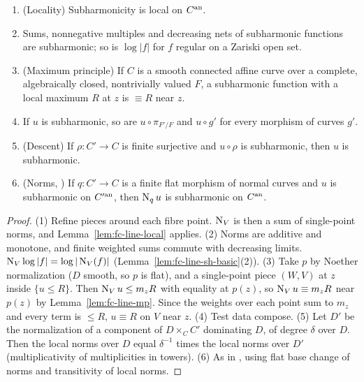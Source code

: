 \begin{proposition}\label{prop:fc-subharmonic-properties}
\notready
{}
\begin{enumerate}
\item (Locality) Subharmonicity is local on $C^{\mathrm{an}}$.
\item Sums, nonnegative multiples and decreasing nets of subharmonic functions are subharmonic; so is $\log|f|$ for $f$
regular on a Zariski open set.
\item (Maximum principle) If $C$ is a smooth connected affine curve over a complete, algebraically closed, nontrivially
valued $F$, a subharmonic function with a local maximum $R$ at $z$ is $\equiv R$ near $z$.
\item If $u$ is subharmonic, so are $u\circ\pi_{F'/F}$ and $u\circ g'$ for every morphism of curves $g'$.
\item (Descent) If $\rho\colon C'\to C$ is finite surjective and $u\circ\rho$ is subharmonic, then $u$ is subharmonic.
\item (Norms, \cite[Lemma~5.21(1)]{FHX}) If $q\colon C'\to C$ is a finite flat morphism of normal curves and $u$ is subharmonic
on $C'^{\mathrm{an}}$, then $\operatorname{N}_qu$ is subharmonic on $C^{\mathrm{an}}$.
\end{enumerate}
\end{proposition}

\begin{proof}
(1) Refine pieces around each fibre point. $\operatorname{N}_V$ is then a sum of single-point norms, and
Lemma~\ref{lem:fc-line-local} applies. (2) Norms are additive and monotone, and finite weighted sums commute with
decreasing limits. $\operatorname{N}_V\log|f|=\log|\operatorname{N}_V(f)|$ (Lemma~\ref{lem:fc-line-sh-basic}(2)). (3) Take $p$ by Noether
normalization ($D$ smooth, so $p$ is flat), and a single-point piece $(W,V)$ at $z$ inside $\{u\le R\}$. Then
$\operatorname{N}_Vu\le m_zR$ with equality at $p(z)$, so $\operatorname{N}_Vu\equiv m_zR$ near $p(z)$ by Lemma~\ref{lem:fc-line-mp}. Since the
weights over each point sum to $m_z$ and every term is $\le R$, $u\equiv R$ on $V$ near $z$. (4) Test data compose.
(5) Let $D'$ be the normalization of a component of $D\times_CC'$ dominating $D$, of degree $\delta$ over $D$. Then the
local norms over $D$ equal $\delta^{-1}$ times the local norms over $D'$ (multiplicativity of multiplicities in
towers). (6) As in \cite[Lemma~5.21(1)]{FHX}, using flat base change of norms and transitivity of local norms.
\end{proof}

